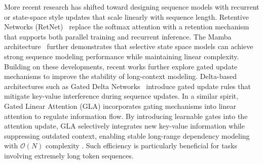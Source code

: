 More recent research has shifted toward designing sequence models with recurrent or state-space style updates that scale linearly with sequence length. Retentive Networks (RetNet)~\cite{sun2023retentive} replace the softmax attention with a retention mechanism that supports both parallel training and recurrent inference. The Mamba architecture~\cite{gu2024mamba,dao2024transformers,lahoti2026mamba,huang2024localmamba,pei2025efficientvmamba} further demonstrates that selective state space models can achieve strong sequence modeling performance while maintaining linear complexity. 
Building on these developments, recent works further explore gated update mechanisms to improve the stability of long-context modeling. Delta-based architectures such as Gated Delta Networks~\cite{yanggated} introduce gated update rules that mitigate key-value interference during sequence updates. In a similar spirit, Gated Linear Attention (GLA) incorporates gating mechanisms into linear attention to regulate information flow\cite{yang2023gated,li2025minimax}. By introducing learnable gates into the attention update, GLA selectively integrates new key-value information while suppressing outdated context, enabling stable long-range dependency modeling with $\mathcal{O}(N)$ complexity \cite{qin2023hierarchically,qin2024hgrn2,katsch2023gateloop,beck2024xlstm}. Such efficiency is particularly beneficial for tasks involving extremely long token sequences.
